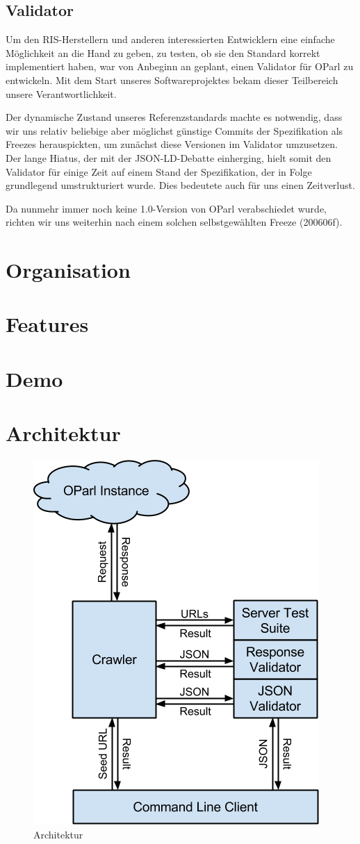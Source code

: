 \documentclass[12pt, fleqn]{scrartcl}
\begin{document}
\subsection{Validator}

Um den RIS-Herstellern und anderen interessierten Entwicklern eine einfache Möglichkeit an die Hand zu geben, zu testen, ob sie den Standard korrekt implementiert haben, war von Anbeginn an geplant, einen Validator für OParl zu entwickeln. Mit dem Start unseres Softwareprojektes bekam dieser Teilbereich unsere Verantwortlichkeit.

Der dynamische Zustand unseres Referenzstandards machte es notwendig, dass wir uns relativ beliebige aber möglichst günstige Commits der Spezifikation als Freezes herauspickten, um zunächst diese Versionen im Validator umzusetzen. Der lange Hiatus, der mit der JSON-LD-Debatte einherging, hielt somit den Validator für einige Zeit auf einem Stand der Spezifikation, der in Folge grundlegend umstrukturiert wurde. Dies bedeutete auch für uns einen Zeitverlust.

Da nunmehr immer noch keine 1.0-Version von OParl verabschiedet wurde, richten wir uns weiterhin nach einem solchen selbstgewählten Freeze (200606f).

\section{Organisation}
\section{Features}
\section{Demo}
\section{Architektur}

\begin{figure}
  \begin{center}
    \includegraphics[width=.5\textwidth]{architecture.final.png}
  \end{center}
  \caption{Architektur}
\end{figure}
\end{document}
